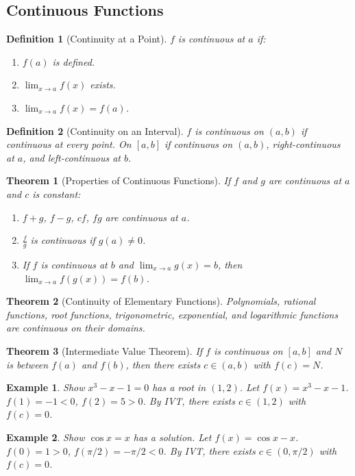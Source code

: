 \documentclass[11pt,a4paper]{article}
\newtheorem{example}{Example}
\newtheorem{theorem}{Theorem}
\newtheorem{definition}{Definition}
\begin{document}
\subsection{Continuous Functions}
\begin{definition}[Continuity at a Point]
$f$ is \textit{continuous at $a$} if:
\begin{enumerate}
\item $f(a)$ is defined.
\item $\lim_{x \to a} f(x)$ exists.
\item $\lim_{x \to a} f(x) = f(a)$.
\end{enumerate}
\end{definition}
\begin{definition}[Continuity on an Interval]
$f$ is continuous on $(a, b)$ if continuous at every point. On $[a, b]$ if continuous on $(a, b)$, right-continuous at $a$, and left-continuous at $b$.
\end{definition}
\begin{theorem}[Properties of Continuous Functions]
If $f$ and $g$ are continuous at $a$ and $c$ is constant:
\begin{enumerate}
\item $f + g$, $f - g$, $cf$, $fg$ are continuous at $a$.
\item $\frac{f}{g}$ is continuous if $g(a) \neq 0$.
\item If $f$ is continuous at $b$ and $\lim_{x \to a} g(x) = b$, then $\lim_{x \to a} f(g(x)) = f(b)$.
\end{enumerate}
\end{theorem}
\begin{theorem}[Continuity of Elementary Functions]
Polynomials, rational functions, root functions, trigonometric, exponential, and logarithmic functions are continuous on their domains.
\end{theorem}
\begin{theorem}[Intermediate Value Theorem]
If $f$ is continuous on $[a, b]$ and $N$ is between $f(a)$ and $f(b)$, then there exists $c \in (a, b)$ with $f(c) = N$.
\end{theorem}
\begin{example}
Show $x^3 - x - 1 = 0$ has a root in $(1, 2)$.
Let $f(x) = x^3 - x - 1$. $f(1) = -1 < 0$, $f(2) = 5 > 0$. By IVT, there exists $c \in (1,2)$ with $f(c) = 0$.
\end{example}
\begin{example}
Show $\cos x = x$ has a solution.
Let $f(x) = \cos x - x$. $f(0) = 1 > 0$, $f(\pi/2) = -\pi/2 < 0$. By IVT, there exists $c \in (0, \pi/2)$ with $f(c) = 0$.
\end{example}
\end{document}
